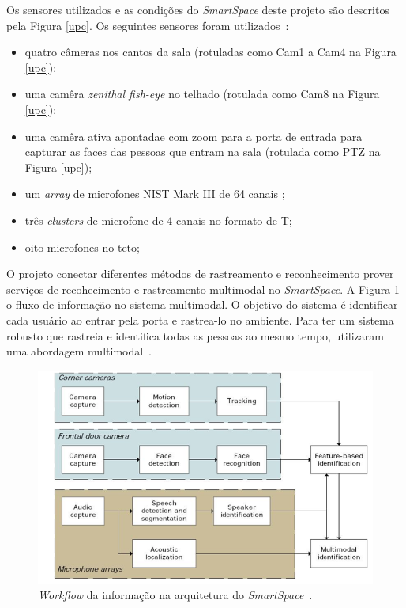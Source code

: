 Os sensores utilizados e as condições do \textit{SmartSpace} deste projeto são descritos pela Figura \ref{upc}. Os seguintes sensores foram utilizados~\cite{salah}:

	\begin{itemize}
		\item quatro câmeras nos cantos da sala (rotuladas como Cam1 a Cam4 na Figura \ref{upc});
		\item uma camêra \textit{zenithal fish-eye} no telhado (rotulada como Cam8 na Figura \ref{upc});
		\item uma camêra ativa apontadae com zoom para a porta de entrada para capturar as faces das pessoas que entram na sala (rotulada como PTZ na Figura \ref{upc});
		\item um \textit{array} de microfones NIST Mark III de 64 canais ;
		\item três \textit{clusters} de microfone de 4 canais no formato de T;
		\item oito microfones no teto;
	\end{itemize}

O projeto conectar diferentes métodos de rastreamento e reconhecimento prover serviços de recohecimento e rastreamento multimodal no \textit{SmartSpace}. A Figura \ref{workflow} o fluxo de informação no sistema multimodal. O objetivo do sistema é identificar cada usuário ao entrar pela porta e rastrea-lo no ambiente. Para ter um sistema robusto que rastreia e identifica todas as pessoas ao mesmo tempo, utilizaram uma abordagem multimodal~\cite{salah}.

\begin{figure}[hbt]
		\begin{center}
			\includegraphics[scale=0.5]{figuras/3.TrabalhosCorrelatos/workflow.png}
		\end{center}
		\caption{\textit{Workflow} da informação na arquitetura do \textit{SmartSpace}~\cite{salah}.}
		\label{workflow}
	\end{figure}

